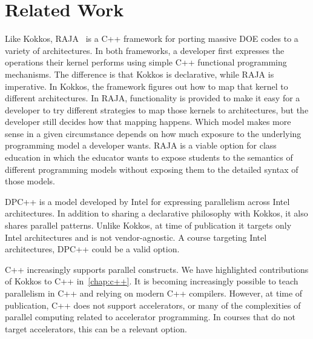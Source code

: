\section{Related Work}\label{chap:related}
Like Kokkos, RAJA~\cite{RAJA} is a C++ framework for porting massive DOE codes to a variety of architectures. In both frameworks, a developer first expresses the operations their kernel performs using simple C++ functional programming mechanisms. The difference is that Kokkos is declarative, while RAJA is imperative. In Kokkos, the framework figures out how to map that kernel to different architectures. In RAJA, functionality is provided to make it easy for a developer to try different strategies to map those kernels to architectures, but the developer still decides how that mapping happens. Which model makes more sense in a given circumstance depends on how much exposure to the underlying programming model a developer wants. RAJA is a viable option for class education in which the educator wants to expose students to the semantics of different programming models without exposing them to the detailed syntax of those models.

DPC++\cite{DPCPP} is a model developed by Intel\textsuperscript{\textregistered} for expressing parallelism across Intel architectures. In addition to sharing a declarative philosophy with Kokkos, it also shares parallel patterns. Unlike Kokkos, at time of publication it targets only Intel architectures and is not vendor-agnostic. A course targeting Intel architectures, DPC++ could be a valid option.

C++ increasingly supports parallel constructs\cite{CPP}. We have highlighted contributions of Kokkos to C++ in~\ref{chap:c++}. It is becoming increasingly possible to teach parallelism in C++ and relying on modern C++ compilers. However, at time of publication, C++ does not support accelerators, or many of the complexities of parallel computing related to accelerator programming. In courses that do not target accelerators, this can be a relevant option.

